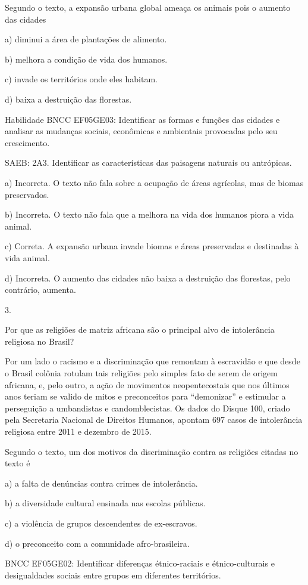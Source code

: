 Segundo o texto, a expansão urbana global ameaça os animais pois o
aumento das cidades

a) diminui a área de plantações de alimento.

b) melhora a condição de vida dos humanos.

c) invade os territórios onde eles habitam.

d) baixa a destruição das florestas.

Habilidade BNCC EF05GE03: Identificar as formas e funções das cidades e
analisar as mudanças sociais, econômicas e ambientais provocadas pelo
seu crescimento.

SAEB: 2A3. Identificar as características das paisagens naturais ou
antrópicas.

a) Incorreta. O texto não fala sobre a ocupação de áreas agrícolas, mas
de biomas preservados.

b) Incorreta. O texto não fala que a melhora na vida dos humanos piora a
vida animal.

c) Correta. A expansão urbana invade biomas e áreas preservadas e
destinadas à vida animal.

d) Incorreta. O aumento das cidades não baixa a destruição das
florestas, pelo contrário, aumenta.

3.

Por que as religiões de matriz africana são o principal alvo de
intolerância religiosa no Brasil?

Por um lado o racismo e a discriminação que remontam à escravidão e que
desde o Brasil colônia rotulam tais religiões pelo simples fato de serem
de origem africana, e, pelo outro, a ação de movimentos neopentecostais
que nos últimos anos teriam se valido de mitos e preconceitos para
``demonizar'' e estimular a perseguição a umbandistas e candomblecistas.
Os dados do Disque 100, criado pela Secretaria Nacional de Direitos
Humanos, apontam 697 casos de intolerância religiosa entre 2011 e
dezembro de 2015.

Segundo o texto, um dos motivos da discriminação contra as religiões
citadas no texto é

a) a falta de denúncias contra crimes de intolerância.

b) a diversidade cultural ensinada nas escolas públicas.

c) a violência de grupos descendentes de ex-escravos.

d) o preconceito com a comunidade afro-brasileira.

BNCC EF05GE02: Identificar diferenças étnico-raciais e étnico-culturais
e desigualdades sociais entre grupos em diferentes territórios.

